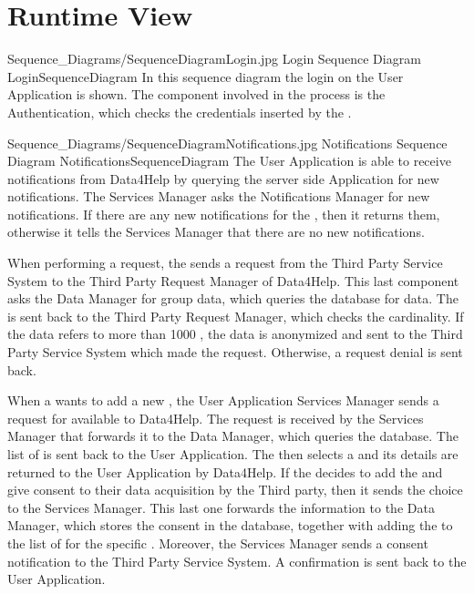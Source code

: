 \documentclass[../../DD.tex]{subfiles}
\begin{document}
\section{Runtime View\label{sect:2.4}}


	\image {13cm} {Sequence_Diagrams/SequenceDiagramLogin.jpg} {Login Sequence Diagram} {LoginSequenceDiagram}
	In this sequence diagram the  login on the User Application is shown. The component involved in the process is the Authentication, which checks the credentials inserted by the .

	\image {13cm} {Sequence_Diagrams/SequenceDiagramNotifications.jpg} {Notifications Sequence Diagram} {NotificationsSequenceDiagram}
	The User Application is able to receive notifications from Data4Help by querying the server side Application for new notifications. The Services Manager asks the Notifications Manager for new notifications. If there are any new notifications for the , then it returns them, otherwise it tells the Services Manager that there are no new notifications.


	When performing a  request, the  sends a request from the Third Party Service System to the Third Party Request Manager of Data4Help. This last component asks the Data Manager for group data, which queries the database for data. The  is sent back to the Third Party Request Manager, which checks the cardinality. If the data refers to more than 1000 , the data is anonymized and sent to the Third Party Service System which made the request. Otherwise, a request denial is sent back.
	
	When a  wants to add a new , the User Application Services Manager sends a request for available  to Data4Help. The request is received by the Services Manager that forwards it to the Data Manager, which queries the database. The list of  is sent back to the User Application. The  then selects a  and its details are returned to the User Application by Data4Help. If the  decides to add the  and give consent to their data acquisition by the Third party, then it sends the choice to the Services Manager. This last one forwards the information to the Data Manager, which stores the consent in the database, together with adding the  to the list of  for the specific . Moreover, the Services Manager sends a consent notification to the Third Party Service System. A confirmation is sent back to the User Application.
\end{document}

